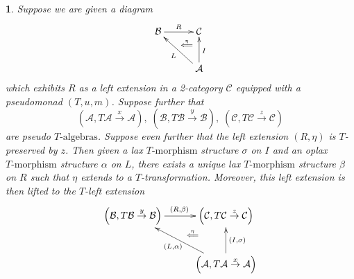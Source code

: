 \documentclass[a4paper,oneside,english]{amsart}
\numberwithin{equation}{section}
\numberwithin{figure}{section}
\theoremstyle{plain}
\theoremstyle{definition}
\theoremstyle{remark}
\theoremstyle{definition}
\theoremstyle{plain}
\newtheorem{prop}[thm]{\protect\propositionname}
\theoremstyle{plain}
\theoremstyle{plain}
\providecommand{\propositionname}{Proposition}
\begin{document}
\begin{prop}
\label{docleftext} Suppose we are given a diagram
\[
\xymatrix@=1em{\mathcal{B}\ar[rr]^{R} &  & \mathcal{C}\ar@{}[ld]|-{\stackrel{\eta}{\Longleftarrow}}\\
 & \;\\
 &  & \mathcal{A}\ar[uu]_{I}\ar[uull]^{L}
}
\]
which exhibits $R$ as a left extension in a 2-category $\mathscr{C}$
equipped with a pseudomonad $\left(T,u,m\right)$. Suppose further
that 
\[
\left(\mathcal{A},T\mathcal{A}\stackrel{x}{\longrightarrow}\mathcal{A}\right),\;\left(\mathcal{B},T\mathcal{B}\stackrel{y}{\longrightarrow}\mathcal{B}\right),\;\left(\mathcal{C},T\mathcal{C}\stackrel{z}{\longrightarrow}\mathcal{C}\right)
\]
are pseudo $T\text{-algebras}$. Suppose even further that the left
extension $\left(R,\eta\right)$ is $T$-preserved by $z$. Then given
a lax $T\text{-morphism}$ structure $\sigma$ on $I$ and an oplax
$T\text{-morphism}$ structure $\alpha$ on $L$, there exists a unique
lax $T\text{-morphism}$ structure $\beta$ on $R$ such that $\eta$
extends to a $T$-transformation. Moreover, this left extension is
then lifted to the $T$-left extension
\[
\xymatrix@=1em{\left(\mathcal{B},T\mathcal{B}\overset{y}{\rightarrow}\mathcal{B}\right)\ar[rr]^{\left(R,\beta\right)} &  & \left(\mathcal{C},T\mathcal{C}\overset{z}{\rightarrow}\mathcal{C}\right)\ar@{}[ld]|-{\stackrel{\eta}{\Longleftarrow}}\\
 & \;\\
 &  & \left(\mathcal{A},T\mathcal{A}\overset{x}{\rightarrow}\mathcal{A}\right)\ar[uu]_{\left(I,\sigma\right)}\ar[uull]^{\left(L,\alpha\right)}
}
\]
\end{prop}
\end{document}
